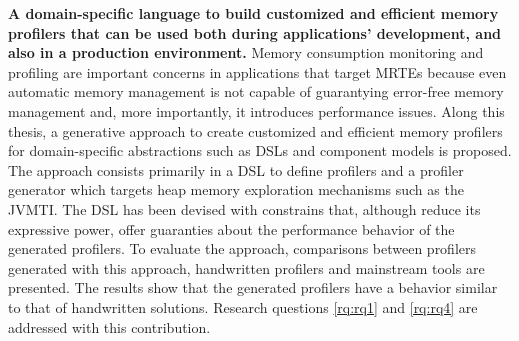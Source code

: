 \textbf{A domain-specific language to build customized and efficient memory profilers that can be used both during applications' development, and also in a production environment.}
Memory consumption monitoring and profiling are important concerns in applications that target MRTEs because even automatic memory management is not capable of guarantying error-free memory management and, more importantly, it introduces performance issues.
Along this thesis, a generative approach to create customized and efficient memory profilers for domain-specific abstractions such as DSLs and component models is proposed.
The approach consists primarily in a DSL to define profilers and a profiler generator which targets heap memory exploration mechanisms such as the \gls{JVMTI}.
The DSL has been devised with constrains that, although reduce its expressive power, offer guaranties about the performance behavior of the generated profilers.
To evaluate the approach, comparisons between profilers generated with this approach, handwritten profilers and mainstream tools are presented.
The results show that the generated profilers have a behavior similar to that of handwritten solutions.
Research questions \ref{rq:rq1} and \ref{rq:rq4} are addressed with this contribution.
